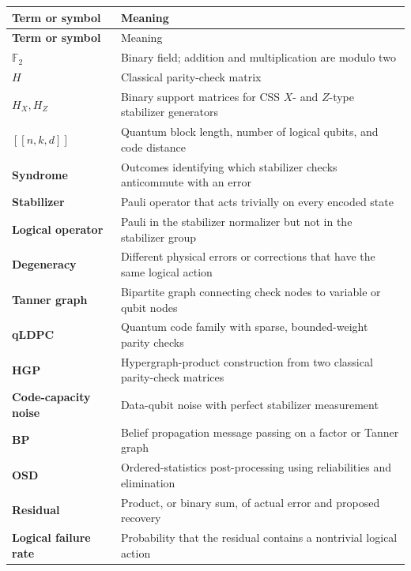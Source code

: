 \documentclass[11pt,letterpaper]{article}
\newcommand{\F}{\mathbb{F}_2}
\begin{document}
\begin{longtable}{>{\bfseries}p{} p{}}
\toprule
Term or symbol & Meaning \\
\midrule
\endfirsthead
\toprule
Term or symbol & Meaning \\
\midrule
\endhead
$\F$ & Binary field; addition and multiplication are modulo two \\
$H$ & Classical parity-check matrix \\
$H_X,H_Z$ & Binary support matrices for CSS $X$- and $Z$-type stabilizer generators \\
$[[n,k,d]]$ & Quantum block length, number of logical qubits, and code distance \\
Syndrome & Outcomes identifying which stabilizer checks anticommute with an error \\
Stabilizer & Pauli operator that acts trivially on every encoded state \\
Logical operator & Pauli in the stabilizer normalizer but not in the stabilizer group \\
Degeneracy & Different physical errors or corrections that have the same logical action \\
Tanner graph & Bipartite graph connecting check nodes to variable or qubit nodes \\
qLDPC & Quantum code family with sparse, bounded-weight parity checks \\
HGP & Hypergraph-product construction from two classical parity-check matrices \\
Code-capacity noise & Data-qubit noise with perfect stabilizer measurement \\
BP & Belief propagation message passing on a factor or Tanner graph \\
OSD & Ordered-statistics post-processing using reliabilities and elimination \\
Residual & Product, or binary sum, of actual error and proposed recovery \\
Logical failure rate & Probability that the residual contains a nontrivial logical action \\
\bottomrule
\end{longtable}
\end{document}

